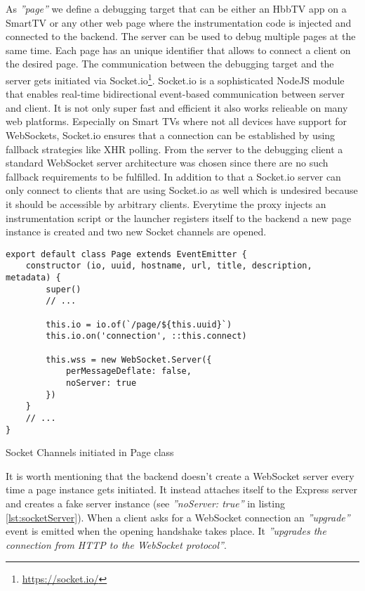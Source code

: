 As \textit{''page''} we define a debugging target that can be either an HbbTV app on a SmartTV or
any other web page where the instrumentation code is injected and connected to the backend. The
server can be used to debug multiple pages at the same time. Each page has an unique identifier
that allows to connect a client on the desired page. The communication between the debugging target
and the server gets initiated via Socket.io\footnote{\url{https://socket.io/}}. Socket.io is a
sophisticated NodeJS module that enables real-time bidirectional event-based communication between
server and client. It is not only super fast and efficient it also works relieable on many web
platforms. Especially on Smart TVs where not all devices have support for WebSockets, Socket.io
ensures that a connection can be established by using fallback strategies like XHR polling. From
the server to the debugging client a standard WebSocket server architecture was chosen since
there are no such fallback requirements to be fulfilled. In addition to that a Socket.io server
can only connect to clients that are using Socket.io as well which is undesired because it should
be accessible by arbitrary clients. Everytime the proxy injects an instrumentation script or the
launcher registers itself to the backend a new page instance is created and two new Socket channels
are opened.

\begin{listing}[H]
\begin{verbatim}
export default class Page extends EventEmitter {
    constructor (io, uuid, hostname, url, title, description, metadata) {
        super()
        // ...

        this.io = io.of(`/page/${this.uuid}`)
        this.io.on('connection', ::this.connect)

        this.wss = new WebSocket.Server({
            perMessageDeflate: false,
            noServer: true
        })
    }
    // ...
}
\end{verbatim}
\caption{Socket Channels initiated in Page class}
\label{lst:socketServer}
\end{listing}

It is worth mentioning that the backend doesn't create a WebSocket server every time a page instance
gets initiated. It instead attaches itself to the Express server and creates a fake server instance
(see \textit{''noServer: true''} in listing \ref{lst:socketServer}). When a client asks for a WebSocket connection
an \textit{''upgrade''} event is emitted when the opening handshake takes place. It \textit{''upgrades
the connection from HTTP to the WebSocket protocol''}\cite{socket}.

